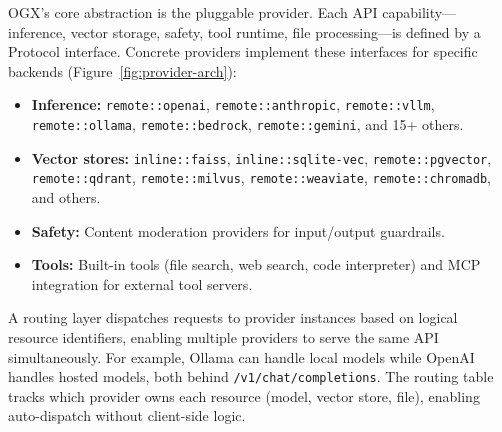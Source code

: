 \documentclass[11pt]{article}
\begin{document}
OGX's core abstraction is the pluggable provider. Each API capability---inference, vector storage, safety, tool runtime, file processing---is defined by a Protocol interface. Concrete providers implement these interfaces for specific backends (Figure~\ref{fig:provider-arch}):
\begin{itemize}[nosep]
  \item \textbf{Inference:} \texttt{remote::openai}, \texttt{remote::anthropic}, \texttt{remote::vllm}, \texttt{remote::ollama}, \texttt{remote::bedrock}, \texttt{remote::ge\-mi\-ni}, and 15+ others.
  \item \textbf{Vector stores:} \texttt{inline::faiss}, \texttt{inline::sqlite-vec}, \texttt{remote::pgvector}, \texttt{remote::qdrant}, \texttt{remote::milvus}, \texttt{remote::weaviate}, \texttt{remote::chromadb}, and others.
  \item \textbf{Safety:} Content moderation providers for input/output guardrails.
  \item \textbf{Tools:} Built-in tools (file search, web search, code interpreter) and MCP~\cite{mcp} integration for external tool servers.
\end{itemize}

A routing layer dispatches requests to provider instances based on logical resource identifiers, enabling multiple providers to serve the same API simultaneously. For example, Ollama can handle local models while OpenAI handles hosted models, both behind \texttt{/v1/chat/completions}. The routing table tracks which provider owns each resource (model, vector store, file), enabling auto-dispatch without client-side logic.
\end{document}
